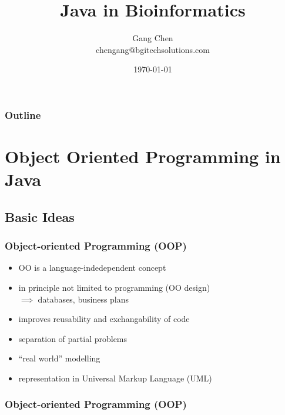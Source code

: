 \documentclass[UTF8]{beamer}
\title{Java in Bioinformatics}
\author{Gang Chen\\ chengang@bgitechsolutions.com}
\date{\today}
\begin{document}
\begin{frame}
\titlepage
\end{frame}

\begin{frame}[t]\frametitle{Outline}
\tableofcontents[hideallsubsections]
\end{frame}



\section{Object Oriented Programming in Java}

\subsection{Basic Ideas}
\begin{frame}
  \frametitle{Object-oriented Programming (OOP)}

  \begin{itemize}
  \item OO is a language-indedependent concept
  \item in principle not limited to programming (OO design)\\
    $\implies$ databases, business plans
  \item improves reusability and exchangability of code
  \item separation of partial problems
  \item ``real world'' modelling
  \item representation in \alert{Universal Markup Language} (UML)
  \end{itemize}
\end{frame}

\begin{frame}
  \frametitle{Object-oriented Programming (OOP)}
\end{frame}
\end{document}
